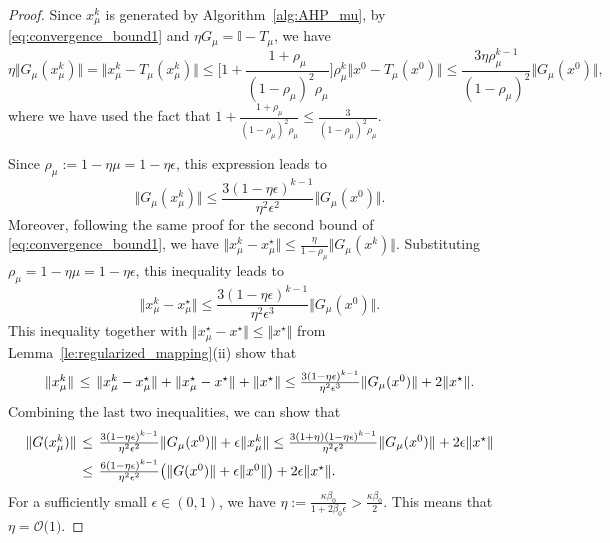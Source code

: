 \documentclass{article}
\theoremstyle{plain}
\theoremstyle{definition}
\newcommand{\Id}{\mathbb{I}}
\newcommand{\norms}[1]{\Vert#1\Vert}
\newcommand{\0}{\boldsymbol{0}}
\newcommand{\BigOs}[1]{\mathcal{O}\big(#1\big)}
\begin{document}
\begin{proof}
Since $x^k_{\mu}$ is generated by Algorithm~\ref{alg:AHP_mu}, by \eqref{eq:convergence_bound1} and $\eta G_{\mu} = \Id - T_{\mu}$, we have
\begin{equation*} 
\eta\norms{ G_{\mu}(x^k_{\mu}) } = \norms{x^k_{\mu} - T_{\mu}(x_{\mu}^k)} \leq  \Big[ 1 + \frac{1+\rho_{\mu}}{(1-\rho_{\mu})^2\rho_{\mu}}\Big] \rho_{\mu}^k \norms{x^0 - T_{\mu}(x^0)} \leq \frac{3\eta \rho_{\mu}^{k-1} }{(1-\rho_{\mu})^2}\norms{G_{\mu}(x^0)},
\end{equation*}
where we have used the fact that $1 + \frac{1+\rho_{\mu}}{(1-\rho_{\mu})^2\rho_{\mu}} \leq \frac{3}{(1-\rho_{\mu})^2\rho_{\mu}}$.

Since $\rho_{\mu} := 1 - \eta\mu = 1 - \eta\epsilon$, this expression leads to 
\begin{equation*} 
\norms{ G_{\mu}(x^k_{\mu}) } \leq \frac{3(1 - \eta\epsilon)^{k-1}}{\eta^2\epsilon^2}\norms{G_{\mu}(x^0)}.
\end{equation*}
Moreover, following the same proof for the second bound of \eqref{eq:convergence_bound1}, we have  $\norms{x^k_{\mu} - x^{\star}_{\mu}} \leq \frac{\eta}{1 - \rho_{\mu}}\norms{G_{\mu}(x^k)}$.
Substituting $\rho_{\mu} = 1 - \eta\mu = 1 - \eta\epsilon$, this inequality leads to
\begin{equation*} 
\norms{ x^k_{\mu} -  x^{\star}_{\mu} } \leq \frac{3(1 - \eta\epsilon)^{k-1}}{\eta^2\epsilon^3}\norms{G_{\mu}(x^0)}.
\end{equation*}
This inequality together with $\norms{x_{\mu}^{\star} - x^{\star}}  \leq \norms{x^{\star}}$ from Lemma~\ref{le:regularized_mapping}(ii) show that
\begin{equation*} 
\arraycolsep=0.2em
\begin{array}{lcl}
\norms{x^k_{\mu}} & \leq & \norms{x^k_{\mu} - x_{\mu}^{\star}} + \norms{x_{\mu}^{\star} - x^{\star}} + \norms{x^{\star}}  \leq \frac{3(1 - \eta\epsilon)^{k-1}}{\eta^2\epsilon^3}\norms{G_{\mu}(x^0)} + 2\norms{x^{\star}}.
\end{array}
\end{equation*}
Combining the last two inequalities, we can show that
\begin{equation*} 
\arraycolsep=0.2em
\begin{array}{lcl}
\norms{ G(x^k_{\mu}) } & \leq & \frac{3(1 - \eta\epsilon)^{k-1}}{\eta^2\epsilon^2}\norms{G_{\mu}(x^0)} + \epsilon\norms{x_{\mu}^k} \leq \frac{3(1+\eta)(1 - \eta\epsilon)^{k-1}}{\eta^2\epsilon^2}\norms{G_{\mu}(x^0)}  + 2 \epsilon \norms{x^{\star}} \vspace{1ex}\\
& \leq & \frac{6(1 - \eta\epsilon)^{k-1}}{\eta^2\epsilon^2 }\big(\norms{G(x^0)} + \epsilon\norms{x^0}\big)  +  2\epsilon\norms{x^{\star}}.
\end{array}
\end{equation*}
For a sufficiently small $\epsilon \in (0, 1)$, we have $\eta := \frac{\kappa \beta_0}{1 + 2\beta_0\epsilon} > \frac{\kappa\beta_0}{2}$.
This means that $\eta = \BigOs{1}$.


\end{proof}
\end{document}
